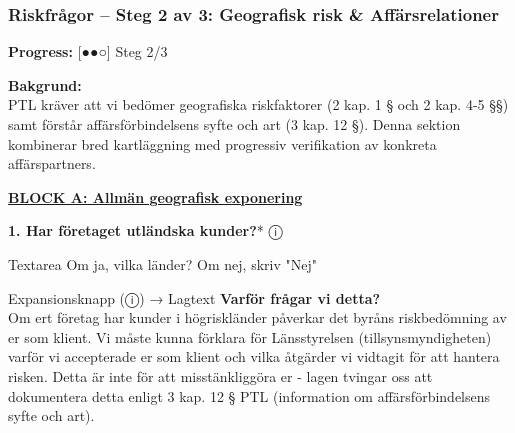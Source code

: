 \documentclass[10pt]{beamer}
\begin{document}
\begin{frame}[label=popup-kyc-kostnad]
  \vspace{0.5cm}
  
  \begin{flushright}
     \hspace{0.3cm} 
  \end{flushright}
\end{frame}



\begin{frame}[label=riskfragor-steg2]
  \frametitle{Riskfrågor – Steg 2 av 3: Geografisk risk \& Affärsrelationer}

  \begin{center}
    \textbf{Progress:} [●●○] Steg 2/3
  \end{center}

  \vspace{0.3cm}

  \footnotesize
  
  \textbf{Bakgrund:}\\
  \tiny PTL kräver att vi bedömer geografiska riskfaktorer (2 kap. 1 § och 2 kap. 4-5 §§) samt förstår 
  affärsförbindelsens syfte och art (3 kap. 12 §). Denna sektion kombinerar bred kartläggning med 
  progressiv verifikation av konkreta affärspartners.

  \vspace{0.4cm}

  \textbf{\underline{BLOCK A: Allmän geografisk exponering}}

  \vspace{0.2cm}

  \textbf{1. Har företaget utländska kunder?}* \hspace{0.3cm} ⓘ
  \begin{block}{Textarea}
    \tiny Om ja, vilka länder? Om nej, skriv "Nej"
  \end{block}
  \begin{alertblock}{Expansionsknapp (ⓘ) → Lagtext}
    \tiny \textbf{Varför frågar vi detta?}\\
    \tiny Om ert företag har kunder i högriskländer påverkar det byråns riskbedömning av er som klient.
    Vi måste kunna förklara för Länsstyrelsen (tillsynsmyndigheten) varför vi accepterade er som klient 
    och vilka åtgärder vi vidtagit för att hantera risken. Detta är inte för att misstänkliggöra er - 
    lagen tvingar oss att dokumentera detta enligt 3 kap. 12 § PTL (information om affärsförbindelsens 
    syfte och art).
    

\end{alertblock}
\end{frame}
\end{document}
